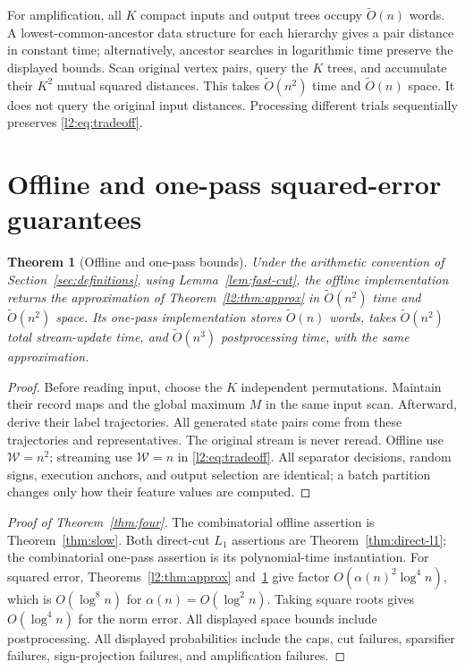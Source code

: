 \documentclass[11pt]{article}
\newtheorem{theorem}{Theorem}[section]
\theoremstyle{definition}
\newcommand{\wt}{\widetilde}
\begin{document}
For amplification, all $K$ compact inputs and output trees occupy
$\wt O(n)$ words. A lowest-common-ancestor data structure for each hierarchy gives a pair
distance in constant time; alternatively, ancestor searches in logarithmic time preserve the displayed bounds. Scan original vertex pairs, query the $K$
trees, and accumulate their $K^2$ mutual squared distances. This takes
$\wt O(n^2)$ time and $\wt O(n)$ space. It does not query the original
input distances. Processing different trials sequentially preserves
\eqref{l2:eq:tradeoff}.

\section{Offline and one-pass squared-error guarantees}

\begin{theorem}[Offline and one-pass bounds]\label{l2:thm:models}
Under the arithmetic convention of Section~\ref{sec:definitions}, using Lemma~\ref{lem:fast-cut}, the offline
implementation returns the approximation of Theorem~\ref{l2:thm:approx}
in $\wt O(n^2)$ time and $\wt O(n^2)$ space.
Its one-pass implementation stores
$\wt O(n)$ words, takes $\wt O(n^2)$ total stream-update time, and
$\wt O(n^3)$ postprocessing time, with the same approximation.
\end{theorem}
\begin{proof}
Before reading input, choose the $K$ independent permutations. Maintain
their record maps and the global maximum $M$ in the same input scan.
Afterward, derive their label trajectories. All generated state pairs
come from these trajectories and representatives. The original stream
is never reread. Offline use $\mathcal W=n^2$; streaming use
$\mathcal W=n$ in \eqref{l2:eq:tradeoff}. All separator decisions, random
signs, execution anchors, and output selection are identical; a batch
partition changes only how their feature values are computed.
\end{proof}



\begin{proof}[Proof of Theorem~\ref{thm:four}]
The combinatorial offline assertion is Theorem~\ref{thm:slow}.
Both direct-cut $L_1$ assertions are Theorem~\ref{thm:direct-l1};
the combinatorial one-pass assertion is its polynomial-time instantiation.
For squared error, Theorems~\ref{l2:thm:approx} and~\ref{l2:thm:models}
give factor $O(\alpha(n)^2\log^4 n)$, which is $O(\log^8 n)$ for
$\alpha(n)=O(\log^2 n)$. Taking square roots gives $O(\log^4 n)$
for the norm error. All displayed space bounds include postprocessing.
All displayed probabilities include the caps, cut failures, sparsifier
failures, sign-projection failures, and amplification failures.
\end{proof}
\end{document}
